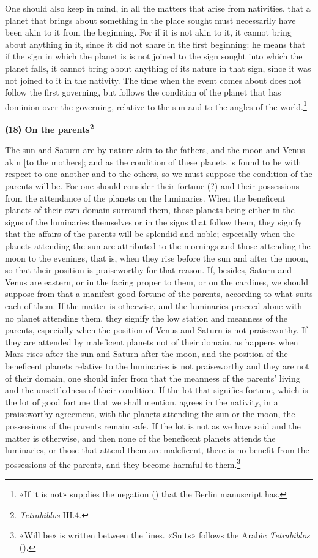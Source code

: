 \documentclass[11pt]{article}
\newcommand{\Fol}[1]{\marginpar{\footnotesize\color{gray}f.\,#1}}
\newcommand{\ChapterHead}[4]{\par\needspace{8\baselineskip}\bigskip\pdfbookmark[1]{#1}{ch-#2}\hypertarget{EN-K#2}{}%
 {\large\bfseries\interlinepenalty=10000 #1#4{\normalfont\normalsize#3}\par}\nobreak\medskip}
\begin{document}
\par One should also keep in mind, in all the matters that arise from nativities, that a planet that brings about something in the place sought must necessarily have been akin to it from the beginning. For if it is not akin to it, it cannot bring about anything in it, since it did not share in the first beginning: he means that if the sign in which the planet is is not joined to the sign sought into which the planet falls, it cannot bring about anything of its nature in that sign, since it was not joined to it in the nativity. The time when the event comes about does not follow the first governing, but follows the condition of the planet that has dominion over the governing, relative to the sun and to the angles of the world.\footnote{«If it is not» supplies the negation () that the Berlin manuscript has.}\par
\ChapterHead{{\mdseries ⟨}18{\mdseries ⟩} On the parents}{18}{}{\footnote{\emph{Tetrabiblos} III.4.}}
\par \Fol{37r}The sun and Saturn are by nature akin to the fathers, and the moon and Venus akin [to the mothers]; and as the condition of these planets is found to be with respect to one another and to the others, so we must suppose the condition of the parents will be. For one should consider their fortune (?) and their possessions from the attendance of the planets on the luminaries. When the beneficent planets of their own domain surround them, those planets being either in the signs of the luminaries themselves or in the signs that follow them, they signify that the affairs of the parents will be splendid and noble; especially when the planets attending the sun are attributed to the mornings and those attending the moon to the evenings, that is, when they rise before the sun and after the moon, so that their position is praiseworthy for that reason. If, besides, Saturn and Venus are eastern, or in the facing proper to them, or on the cardines, we should suppose from that a manifest good fortune of the parents, according to what suits each of them. If the matter is otherwise, and the luminaries proceed alone with no planet attending them, they signify the low station and meanness of the parents, especially when the position of Venus and Saturn is not praiseworthy. If they are attended by maleficent planets not of their domain, as happens when Mars rises after the sun and Saturn after the moon, and the position of the beneficent planets relative to the luminaries is not praiseworthy and they are not of their domain, one should infer from that the meanness of the parents' living and the unsettledness of their condition. If the lot that signifies fortune, which is the lot of good fortune that we shall mention, agrees in the nativity, in a praiseworthy agreement, with the planets attending the sun or the moon, the possessions of the parents remain safe. If the lot is not as we have said and the matter is otherwise, and then none of the beneficent planets attends the luminaries, or those that attend them are maleficent, there is no benefit from the possessions of the parents, and they become harmful to them.\footnote{«Will be» is written between the lines. «Suits» follows the Arabic \emph{Tetrabiblos} ().}\par
\end{document}
